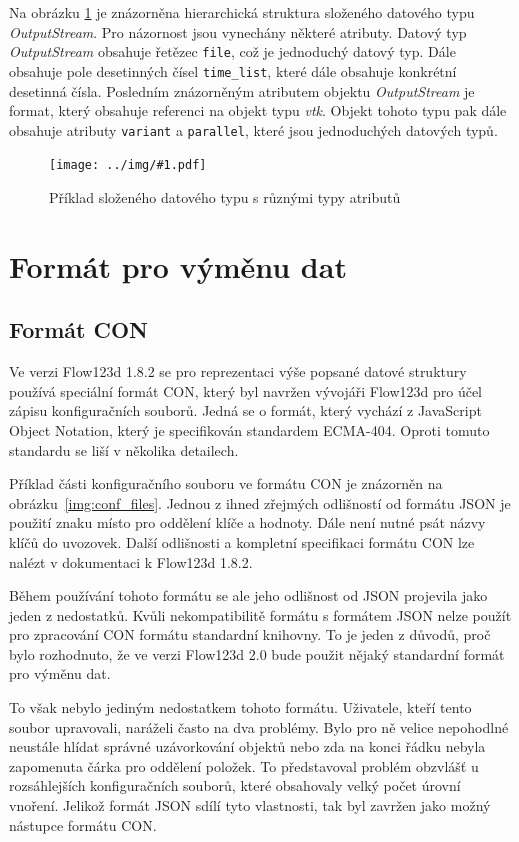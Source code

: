 \documentclass[FM,bw,DP]{tulthesis}
\newcommand{\includeimg}[2]{%
\begin{figure}[h]
	\centering
    \texttt{[image: ../img/\#1.pdf]}
    \caption{#2}
	\label{img:#1}
\end{figure}
}
\begin{document}
Na obrázku \ref{img:data_tree} je znázorněna hierarchická struktura složeného datového typu \textit{OutputStream}. Pro názornost jsou vynechány některé atributy. Datový typ \textit{OutputStream} obsahuje řetězec \texttt{file}, což je jednoduchý datový typ. Dále obsahuje pole desetinných čísel \texttt{time\_list}, které dále obsahuje konkrétní desetinná čísla. Posledním znázorněným atributem objektu \textit{OutputStream} je format, který obsahuje referenci na objekt typu \textit{vtk}. Objekt tohoto typu pak dále obsahuje atributy \texttt{variant} a \texttt{parallel}, které jsou jednoduchých datových typů.

\includeimg{data_tree}{Příklad složeného datového typu s různými typy atributů}

\section{Formát pro výměnu dat}

\subsection{Formát CON}

Ve verzi Flow123d 1.8.2 se pro reprezentaci výše popsané datové struktury používá speciální formát CON, který byl navržen vývojáři Flow123d pro účel zápisu konfiguračních souborů. Jedná se o formát, který vychází z JavaScript Object Notation, který je specifikován standardem ECMA-404. Oproti tomuto standardu se liší v několika detailech.

Příklad části konfiguračního souboru ve formátu CON je znázorněn na obrázku~\ref{img:conf_files}. Jednou z ihned zřejmých odlišností od formátu JSON je použití znaku \uv{\texttt{=}} místo \uv{\texttt{:}} pro oddělení klíče a hodnoty. Dále není nutné psát názvy klíčů do uvozovek. Další odlišnosti a kompletní specifikaci formátu CON lze nalézt v dokumentaci k Flow123d 1.8.2.

Během používání tohoto formátu se ale jeho odlišnost od JSON projevila jako jeden z nedostatků. Kvůli nekompatibilitě formátu s formátem JSON nelze použít pro zpracování CON formátu standardní knihovny. To je jeden z důvodů, proč bylo rozhodnuto, že ve verzi Flow123d 2.0 bude použit nějaký standardní formát pro výměnu dat.

To však nebylo jediným nedostatkem tohoto formátu. Uživatele, kteří tento soubor upravovali, naráželi často na dva problémy. Bylo pro ně velice nepohodlné neustále hlídat správné uzávorkování objektů nebo zda na konci řádku nebyla zapomenuta čárka pro oddělení položek. To představoval problém obzvlášť u rozsáhlejších konfiguračních souborů, které obsahovaly velký počet úrovní vnoření. Jelikož formát JSON sdílí tyto vlastnosti, tak byl zavržen jako možný nástupce formátu CON.
\end{document}
